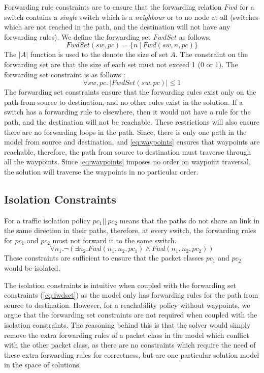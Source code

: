 Forwarding rule constraints are to ensure that the forwarding relation $Fwd$ for a switch contains a \emph{single} switch which is a \emph{neighbour} or to no node at all (switches which are not reached in the path, and the destination will not have any forwarding rules). We define the forwarding set $FwdSet$ as follows:
\begin{equation}
	FwdSet(sw,pc) = \{n \ | \ Fwd(sw,n,pc)\}
\end{equation}
The $|A|$ function is used to the denote the size of set $A$. The constraint on the forwarding set are that the size of each set must not exceed 1 (0 or 1). The forwarding set constraint is as follows : 
\begin{equation}
		\forall sw,pc . \ |FwdSet(sw,pc)| \leq 1 \label{eq:fwdset}
\end{equation}
The forwarding set constraints ensure that the forwarding rules exist only on the path from source to destination, and no other rules exist in the solution. If a switch has a forwarding rule to  elsewhere, then it would not have a rule for the path, and the destination will not be reachable. These restrictions will also ensure there are no forwarding loops in the path. 
Since, there is only one path in the model from source and destination, and \cref{eq:waypoints} ensures that waypoints are reachable, therefore, the path from source to destination must traverse through all the waypoints. Since \cref{eq:waypoints} imposes no order on waypoint traversal, the solution will traverse the waypoints in no particular order. 

\subsection{Isolation Constraints}
For a traffic isolation policy $pc_1 || \ pc_2$ means that the paths do not share an link in the same direction in their paths, therefore, at every switch, the forwarding rules for $pc_1$ and $pc_2$ must not forward it to the same switch.  
\begin{equation}
	\forall n_1. \neg ( \exists n_2. Fwd(n_1,n_2,pc_1) \wedge Fwd(n_1,n_2,pc_2)) \label{eq:isolation}
\end{equation}
These constraints are sufficient to ensure that the packet classes $pc_1$ and $pc_2$ would be isolated. 

The isolation constraints is intuitive when coupled with the forwarding set constraints (\cref{eq:fwdset}) as the model only has forwarding rules for the path from source to destination. However, for a reachability policy without waypoints, we argue that the forwarding set constraints are not required when coupled with the isolation constraints. The reasoning behind this is that the solver would simply remove the extra forwarding rules of a packet class in the model which conflict with the other packet class, as there are no constraints which require the need of these extra forwarding rules for correctness, but are one particular solution model in the space of solutions. 

